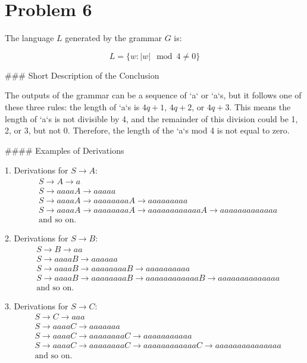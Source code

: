\documentclass{article}
\begin{document}
\section*{Problem 6}

The language \( L \) generated by the grammar \( G \) is:

\[
L = \{ w \colon |w| \mod 4 \neq 0 \}
\]

### Short Description of the Conclusion

The outputs of the grammar can be a sequence of `a` or `a`s, but it follows one of these three rules: the length of `a`s is \( 4q + 1 \), \( 4q + 2 \), or \( 4q + 3 \). This means the length of `a`s is not divisible by 4, and the remainder of this division could be 1, 2, or 3, but not 0. Therefore, the length of the `a`s mod 4 is not equal to zero.

#### Examples of Derivations

1. Derivations for \( S \rightarrow A \):
   \[
   \begin{aligned}
   & S \rightarrow A \rightarrow a \\
   & S \rightarrow aaaaA \rightarrow aaaaa \\
   & S \rightarrow aaaaA \rightarrow aaaaaaaaA \rightarrow aaaaaaaaa \\
   & S \rightarrow aaaaA \rightarrow aaaaaaaaA \rightarrow aaaaaaaaaaaaA \rightarrow aaaaaaaaaaaaa \\
   & \text{and so on.}
   \end{aligned}
   \]

2. Derivations for \( S \rightarrow B \):
   \[
   \begin{aligned}
   & S \rightarrow B \rightarrow aa \\
   & S \rightarrow aaaaB \rightarrow aaaaaa \\
   & S \rightarrow aaaaB \rightarrow aaaaaaaaB \rightarrow aaaaaaaaaa \\
   & S \rightarrow aaaaB \rightarrow aaaaaaaaB \rightarrow aaaaaaaaaaaaB \rightarrow aaaaaaaaaaaaaa \\
   & \text{and so on.}
   \end{aligned}
   \]

3. Derivations for \( S \rightarrow C \):
   \[
   \begin{aligned}
   & S \rightarrow C \rightarrow aaa \\
   & S \rightarrow aaaaC \rightarrow aaaaaaa \\
   & S \rightarrow aaaaC \rightarrow aaaaaaaaC \rightarrow aaaaaaaaaaa \\
   & S \rightarrow aaaaC \rightarrow aaaaaaaaC \rightarrow aaaaaaaaaaaaC \rightarrow aaaaaaaaaaaaaaa \\
   & \text{and so on.}
   \end{aligned}
   \]
\end{document}
